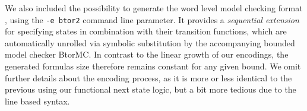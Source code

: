 We also included the possibility to generate the word level model checking format \BTOR{} \cite{ref:BTOR2}, using the \texttt{-e btor2} command line parameter.
It provides a \emph{sequential extension} for specifying %
states in combination with their transition functions,
which are automatically unrolled via symbolic substitution by the accompanying bounded model checker BtorMC.
In contrast to the linear growth of our \SMTLIB{} encodings, the generated formulas size therefore remains constant for any given bound. %
We omit further details about the encoding process, as it is more or less identical to the previous using our functional next state logic, but a bit more tedious due to the line based syntax.

